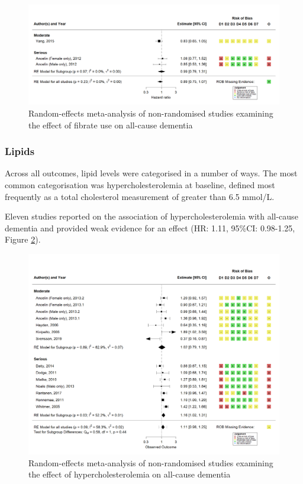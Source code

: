 \documentclass[a4paper, twoside]{templates/ociamthesis}
\begin{document}
\begin{figure}[H]
\includegraphics[width=1\linewidth]{figures/sys-rev/fp_obs_Fibrate_Dementia} \caption[Random-effects meta-analysis of statins on all-cause dementia]{Random-effects meta-analysis of non-randomised studies examining the effect of fibrate use on all-cause dementia}\label{fig:obsFibrateDementiaFig}
\end{figure}

\hypertarget{lipids}{%
\subsubsection{Lipids}\label{lipids}}

Across all outcomes, lipid levels were categorised in a number of ways. The most common categorisation was hypercholesterolemia at baseline, defined most frequently as a total cholesterol measurement of greater than 6.5 mmol/L.

Eleven studies reported on the association of hypercholesterolemia with all-cause dementia and provided weak evidence for an effect (HR: 1.11, 95\%CI: 0.98-1.25, Figure \ref{fig:obsHyperDementia}).





\begin{figure}[H]
\includegraphics[width=1\linewidth]{figures/sys-rev/fp_obs_hyperchol_Dementia} \caption[Meta-analysis of hypercholesterolemia on all-cause dementia]{Random-effects meta-analysis of non-randomised studies examining the effect of hypercholesterolemia on all-cause dementia}\label{fig:obsHyperDementia}
\end{figure}
\end{document}
